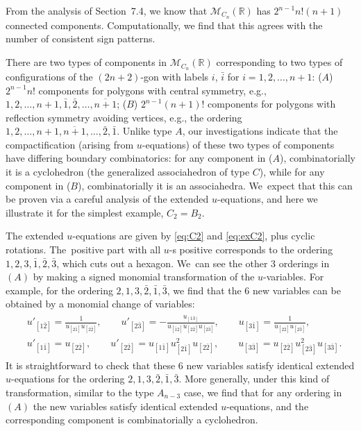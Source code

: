 \documentclass[pdftex]{sigma}%
\def\R{{\mathbb R}}
\def\M{{\mathcal{M}}}
\numberwithin{equation}{section}
\begin{document}
\bigskip{}
From the analysis of Section~7.4, we know that $\M_{C_n}(\R)$ has $2^{n{-}1}n! (n+1)$ connected components. Computationally, we find that this agrees with the number of consistent sign patterns.

There are two types of components in ${\mathcal M}_{C_n}(\R)$ corresponding to two types of configurations of the $(2n{+}2)$-gon with labels $i$, $\bar{i}$ for $i=1,2, \dots, n{+}1$: ($A$) $2^{n{-}1} n!$ components for polygons with central symmetry, e.g., $1,2, \dots, n{+}1, \bar{1}, \bar{2}, \dots, \overline{n{+}1}$; ($B$) $2^{n{-}1} (n{+}1)!$ components for polygons with reflection symmetry avoiding vertices, e.g., the ordering $1, 2, \dots, n{+}1, \overline{n{+}1}, \dots, \bar{2}, \bar{1}$. Unlike type $A$, our investigations indicate that the compactification (arising from $u$-equations) of these two types of components have differing boundary combinatorics: for any component in ($A$), combinatorially it is a cyclohedron (the generalized associahedron of type $C$), while for any component in ($B$), combinatorially it is an associahedra. We~expect that this can be proven via a careful analysis of the extended $u$-equations, and here we illustrate it for the simplest example, $C_2=B_2$.

The extended $u$-equations are given by \eqref{eq:C2} and \eqref{eq:exC2}, plus cyclic rotations. The~positive part with all $u$-s positive corresponds to the ordering $1,2,3,\bar{1}, \bar{2}, \bar{3}$, which cuts out a hexagon. We~can see the other $3$ orderings in $(A)$ by making a signed monomial transformation of the $u$-variables. For example, for the ordering $2,1,3, \bar{2}, \bar{1}, \bar{3}$, we find that the $6$ new variables can be obtained by a monomial change of variables:
\begin{gather*}
\begin{split}
&u'_{[1 \bar{2}]}=\frac{1}{u_{[2 \bar{1}] }u_{[2 \bar{2}]}},\qquad
u'_{[2 \bar{3}]}=-\frac{u_{[1 3]}}{u_{[\bar{1} 2]} u_{[2 \bar{2}]} u_{[2 \bar{3}]}}, \qquad
u_{[3 \bar{1}]}=\frac{1}{u_{[2 \bar{2}]}u_{[2 \bar{3}]}},
\\
&u'_{[1 \bar{1}]}=u_{[2 \bar{2}]},\qquad
u'_{[2 \bar{2}]}=u_{[1 \bar{1}]} u^2_{[2 \bar{1}]} u_{[2 \bar{2}]},\qquad
u_{[3 \bar{3}]}=u_{[2 \bar{2}]} u^2_{[2 \bar{3}]}u_{[3 \bar{3}]}.
\end{split}
\end{gather*}
It is straightforward to check that these $6$ new variables satisfy identical extended $u$-equations for the ordering $2,1, 3, \bar{2}, \bar{1}, \bar{3}$. More generally, under this kind of transformation, similar to the type $A_{n-3}$ case, we find that for any ordering in $(A)$ the new variables satisfy identical extended $u$-equations, and the corresponding component is combinatorially a cyclohedron.
\end{document}
